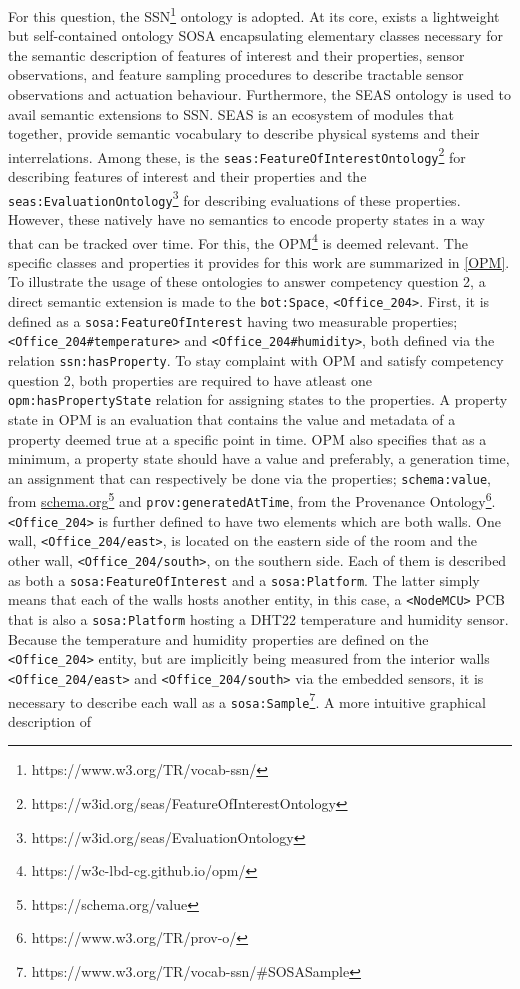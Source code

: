 \begin{enumerate}
For this question, the \acf{SSN}\footnote{https://www.w3.org/TR/vocab-ssn/} \citep{Haller2017} ontology is adopted. At its core, exists a lightweight but self-contained ontology \ac{SOSA} encapsulating elementary classes necessary for the semantic description of features of interest and their properties, sensor observations, and feature sampling procedures to describe tractable sensor observations and actuation behaviour. Furthermore, the \ac{SEAS} \citep{Lefrancois2016} ontology is used to avail semantic extensions to \ac{SSN}. \ac{SEAS} is an ecosystem of modules that together, provide semantic vocabulary to describe physical systems and their interrelations. Among these, is the \texttt{seas:FeatureOfInterestOntology}\footnote{https://w3id.org/seas/FeatureOfInterestOntology} for describing features of interest and their properties and the \texttt{seas:EvaluationOntology}\footnote{https://w3id.org/seas/EvaluationOntology} for describing evaluations of these properties. However, these natively have no semantics to encode property states in a way that can be tracked over time. For this, the \ac{OPM}\footnote{https://w3c-lbd-cg.github.io/opm/} \citep{Rasmussen2018a} is deemed relevant. The specific classes and properties it provides for this work are summarized in \autoref{OPM}. To illustrate the usage of these ontologies to answer competency question 2, a direct semantic extension is made to the \texttt{bot:Space}, \texttt{<Office\_204>}. First, it is defined as a \texttt{sosa:FeatureOfInterest} having two measurable properties; \texttt{<Office\_204\#temperature>} and \texttt{<Office\_204\#humidity>}, both defined via the relation \texttt{ssn:hasProperty}. To stay complaint with OPM and satisfy competency question 2, both properties are required to have atleast one \texttt{opm:hasPropertyState} relation for assigning states to the properties. A property state in \ac{OPM} is an evaluation that contains the value and metadata of a property deemed true at a specific point in time. \ac{OPM} also specifies that as a minimum, a property state should have a value and preferably, a generation time, an assignment that can respectively be done via the properties; \texttt{schema:value}, from \url{schema.org}\footnote{https://schema.org/value} and \texttt{prov:generatedAtTime}, from the Provenance Ontology\footnote{https://www.w3.org/TR/prov-o/}. \texttt{<Office\_204>} is further defined to have two elements which are both walls. One wall, \texttt{<Office\_204/east>}, is located on the eastern side of the room and the other wall, \texttt{<Office\_204/south>}, on the southern side. Each of them is described as both a \texttt{sosa:FeatureOfInterest} and a \texttt{sosa:Platform}. The latter simply means that each of the walls hosts another entity, in this case, a \texttt{<NodeMCU>} \ac{PCB} that is also a \texttt{sosa:Platform} hosting a DHT22 temperature and humidity sensor. Because the temperature and humidity properties are defined on the \texttt{<Office\_204>} entity, but are implicitly being measured from the interior walls \texttt{<Office\_204/east>} and \texttt{<Office\_204/south>} via the embedded sensors, it is necessary to describe each wall as a \texttt{sosa:Sample}\footnote{https://www.w3.org/TR/vocab-ssn/\#SOSASample}. A more intuitive graphical description of 
\end{enumerate}
